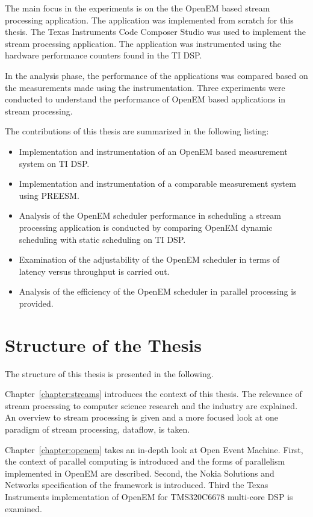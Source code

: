 The main focus in the experiments is on the the OpenEM based stream processing application. The application was implemented from scratch for this thesis. The Texas Instruments Code Composer Studio was used to implement the stream processing application. The application was instrumented using the hardware performance counters found in the TI DSP.

In the analysis phase, the performance of the applications was compared based on the measurements made using the instrumentation. Three experiments were conducted to understand the performance of OpenEM based applications in stream processing.

The contributions of this thesis are summarized in the following listing:
\begin{itemize}
    \item Implementation and instrumentation of an OpenEM based measurement system on TI DSP.
    \item Implementation and instrumentation of a comparable measurement system using PREESM.
    \item Analysis of the OpenEM scheduler performance in scheduling a stream processing application is conducted by comparing OpenEM dynamic scheduling with static scheduling on TI DSP.
    \item Examination of the adjustability of the OpenEM scheduler in terms of latency versus throughput is carried out.
    \item Analysis of the efficiency of the OpenEM scheduler in parallel processing is provided.
\end{itemize}

\section{Structure of the Thesis}
\label{section:structure}
The structure of this thesis is presented in the following.

Chapter~\ref{chapter:streams} introduces the context of this thesis. The relevance of stream processing to computer science research and the industry are explained. An overview to stream processing is given and a more focused look at one paradigm of stream processing, dataflow, is taken.

Chapter~\ref{chapter:openem} takes an in-depth look at Open Event Machine. First, the context of parallel computing is introduced and the forms of parallelism implemented in OpenEM are described. Second, the Nokia Solutions and Networks specification of the framework is introduced. Third the Texas Instruments implementation of OpenEM for TMS320C6678 multi-core DSP is examined.

